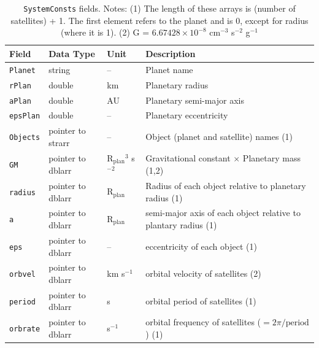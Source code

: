 \documentclass[11pt]{article}
\newcommand\Rplan{R$_{\mathrm{plan}}$}
\begin{document}
\begin{table}
\begin{tabular}{llll}
\textbf{Field} & \textbf{Data Type} & \textbf{Unit} & \textbf{Description}
  \\ \hline 
\texttt{Planet} & string & -- &  Planet name  \\
\texttt{rPlan} & double & km &  Planetary radius \\
\texttt{aPlan} & double & AU & Planetary semi-major axis \\
\texttt{epsPlan} & double & -- & Planetary eccentricity \\
\texttt{Objects} & pointer to strarr & -- & Object (planet and 
  satellite) names (1) \\
\texttt{GM} & pointer to dblarr & \Rplan$^3$ s$^{-2}$ & Gravitational
constant $\times$ Planetary mass (1,2) \\
\texttt{radius} & pointer to dblarr & \Rplan & Radius of each object
relative to planetary radius (1) \\
\texttt{a} & pointer to dblarr & \Rplan & semi-major axis of each object
relative to plantary radius (1) \\
\texttt{eps} & pointer to dblarr & -- & eccentricity of each object (1) \\
\texttt{orbvel} & pointer to dblarr & km s$^{-1}$ & orbital velocity of
satellites (2) \\ 
\texttt{period} & pointer to dblarr & s & orbital period of satellites (1) \\
\texttt{orbrate} & pointer to dblarr & s$^{-1}$ & orbital frequency of
satellites ($=2 \pi/\mathrm{period}$) (1)
\end{tabular}
\caption[\texttt{SystemConsts} fields]{\texttt{SystemConsts} fields. Notes: 
(1) The length of these arrays is (number of satellites) + 1. The first
element refers to the planet and is 0, except for radius (where it is 1).
(2) G = $6.67428\times10^{-8}$  cm$^{-3}$ s$^{-2}$ g$^{-1}$ }
\label{table:systemconsts}
\end{table}
\clearpage
\end{document}

